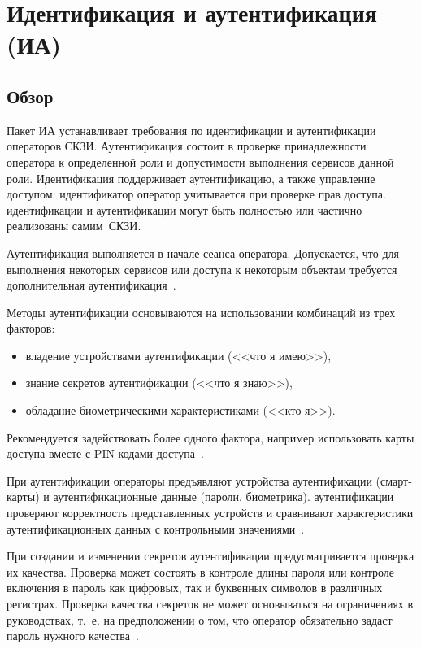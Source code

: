 \section{Идентификация и аутентификация (ИА)}\label{IA}

\subsection{Обзор}\label{IA.Intro}

Пакет ИА устанавливает требования по идентификации и аутентификации операторов 
СКЗИ. Аутентификация состоит в проверке принадлежности оператора к определенной 
роли и допустимости выполнения сервисов данной роли. Идентификация поддерживает 
аутентификацию, а также управление доступом: идентификатор оператор 
учитывается при проверке прав доступа.
%
 идентификации и аутентификации могут быть полностью или 
частично реализованы самим~СКЗИ.

Аутентификация выполняется в начале сеанса оператора.
Допускается, что для выполнения некоторых сервисов 
или доступа к некоторым объектам требуется дополнительная 
аутентификация~. 

Методы аутентификации основываются на использовании комбинаций из трех факторов:
\begin{itemize}
\item
владение устройствами аутентификации (<<что я имею>>), 
\item
знание секретов аутентификации (<<что я знаю>>), 
\item
обладание биометрическими характеристиками (<<кто я>>).
\end{itemize}

Рекомендуется задействовать более одного фактора, например использовать 
карты доступа вместе с PIN-кодами доступа~.

При аутентификации операторы предъявляют устройства аутентификации 
(смарт-карты) и аутентификационные данные (пароли, биометрика).
%
 аутентификации проверяют корректность представленных 
устройств и сравнивают характеристики аутентификационных данных с контрольными  
значениями~.

При создании и изменении секретов аутентификации предусматривается проверка их
качества. Проверка может состоять в контроле длины пароля или контроле включения
в пароль как цифровых, так и буквенных символов в различных регистрах. Проверка
качества секретов не может основываться на ограничениях в руководствах, т.~е. на
предположении о том, что оператор обязательно задаст пароль нужного
качества~.

